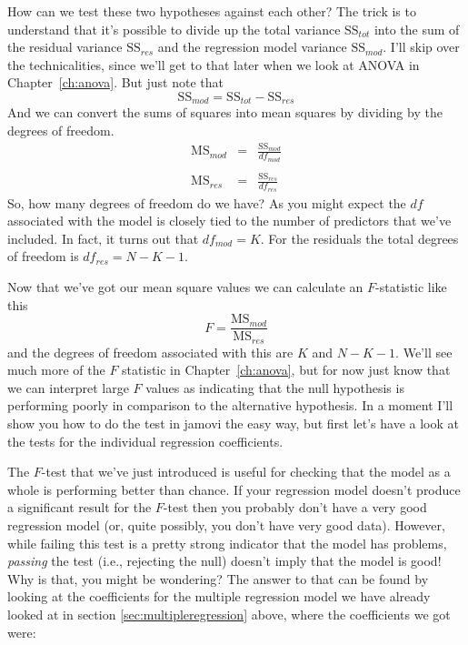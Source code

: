 How can we test these two hypotheses against each other? The trick is to understand that it's possible to divide up the total variance $\mbox{SS}_{tot}$ into the sum of the residual variance $\mbox{SS}_{res}$ and the regression model variance $\mbox{SS}_{mod}$. I'll skip over the technicalities, since we'll get to that later when we look at ANOVA in Chapter~\ref{ch:anova}. But just note that
$$
\mbox{SS}_{mod} = \mbox{SS}_{tot} - \mbox{SS}_{res}
$$
And we can convert the sums of squares into mean squares by dividing by the degrees of freedom. 
$$\begin{array}{rcl}
\mbox{MS}_{mod} &=& \displaystyle\frac{\mbox{SS}_{mod} }{df_{mod}} \\ \\
\mbox{MS}_{res} &=& \displaystyle\frac{\mbox{SS}_{res} }{df_{res}} 
\end{array}
$$ 
So, how many degrees of freedom do we have? As you might expect the $df$ associated with the model is closely tied to the number of predictors that we've included. In fact, it turns out that $df_{mod} = K$. For the residuals the total degrees of freedom is $df_{res} = N -K - 1$. 

Now that we've got our mean square values we can calculate an $F$-statistic like this
$$
F =  \frac{\mbox{MS}_{mod}}{\mbox{MS}_{res}}
$$
and the degrees of freedom associated with this are $K$ and $N-K-1$. We'll see much more of the $F$ statistic in Chapter~\ref{ch:anova}, but for now just know that we can interpret large $F$ values as indicating that the null hypothesis is performing poorly in comparison to the alternative hypothesis. In a moment I'll show you how to do the test in jamovi the easy way, but first let's have a look at the tests for the individual regression coefficients.


The $F$-test that we've just introduced is useful for checking that the model as a whole is performing better than chance. If your regression model doesn't produce a significant result for the $F$-test then you probably don't have a very good regression model (or, quite possibly, you don't have very good data). However, while failing this test is a pretty strong indicator that the model has problems, {\it passing} the test (i.e., rejecting the null) doesn't imply that the model is good! Why is that, you might be wondering? The answer to that can be found by looking at the coefficients for the multiple regression model we have already looked at in section \ref{sec:multipleregression} above, where the coefficients we got were:

